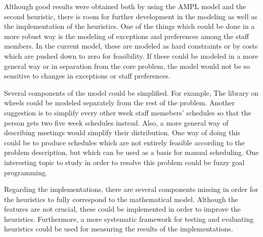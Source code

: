 Although good results were obtained both by using the AMPL model and the second heuristic, there is room for further development in the modeling as well as the implementation of the heuristics. One of the things which could be done in a more robust way is the modeling of exceptions and preferences among the staff members. In the current model, these are modeled as hard constraints or by costs which are pushed down to zero for feasibility. If these could be modeled in a more general way or in separation from the core problem, the model would not be so sensitive to changes in exceptions or staff preferences.


Several components of the model could be simplified. For example, The library on wheels could be modeled separately from the rest of the problem. Another suggestion is to simplify every other week staff memebers' schedules so that the person gets two five week schedules instead. Also, a more general way of describing meetings would simplify their distribution. One way of doing this could be to produce schedules which are not entirely feasible according to the problem description, but which can be used as a basis for manual scheduling. One interesting topic to study in order to resolve this problem could be fuzzy goal programming.

Regarding the implementations, there are several components missing in order for the heuristics to fully correspond to the mathematical model. Although the features are not crucial, these could be implemented in order to improve the heuristics. Furthermore, a more systematic framework for testing and evaluating heuristics could be used for measuring the results of the implementations.


\iffalse
Although the constraints were difficult to model, the actual problem was not very difficult to solve, neither for CPLEX nor for the second heuristic.  


For both of the heuristics the first step is to generalize the problem to ten weeks instead of five. In doing so, the heuristics will have the same time span as the AMPL implementation. Furthermore, if meetings are implemented and five-week separated work weeks look alike the heuristics will solve the same problem as the AMPL implementation. 

By looking at the results from the heuristics it deems possible to solve the complete problem by spending more time implementing. However, regardless if such results were reached it would only work for this specific library. A general solver would not be a feature that could be implemented. The reason is due to the uniqueness of requirements in the library. In case they were similar someone would, most likely, already have created a general solver for libraries or any other service institution.
\fi
